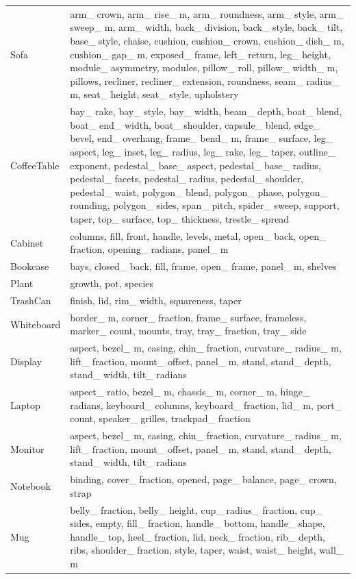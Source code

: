 \begin{longtable}{p{.20\linewidth}p{.74\linewidth}}
Sofa & arm\_ crown, arm\_ rise\_ m, arm\_ roundness, arm\_ style, arm\_ sweep\_ m, arm\_ width, back\_ division, back\_ style, back\_ tilt, base\_ style, chaise, cushion, cushion\_ crown, cushion\_ dish\_ m, cushion\_ gap\_ m, exposed\_ frame, left\_ return, leg\_ height, module\_ asymmetry, modules, pillow\_ roll, pillow\_ width\_ m, pillows, recliner, recliner\_ extension, roundness, seam\_ radius\_ m, seat\_ height, seat\_ style, upholstery \\
CoffeeTable & bay\_ rake, bay\_ style, bay\_ width, beam\_ depth, boat\_ blend, boat\_ end\_ width, boat\_ shoulder, capsule\_ blend, edge\_ bevel, end\_ overhang, frame\_ bend\_ m, frame\_ surface, leg\_ aspect, leg\_ inset, leg\_ radius, leg\_ rake, leg\_ taper, outline\_ exponent, pedestal\_ base\_ aspect, pedestal\_ base\_ radius, pedestal\_ facets, pedestal\_ radius, pedestal\_ shoulder, pedestal\_ waist, polygon\_ blend, polygon\_ phase, polygon\_ rounding, polygon\_ sides, span\_ pitch, spider\_ sweep, support, taper, top\_ surface, top\_ thickness, trestle\_ spread \\
Cabinet & columns, fill, front, handle, levels, metal, open\_ back, open\_ fraction, opening\_ radians, panel\_ m \\
Bookcase & bays, closed\_ back, fill, frame, open\_ frame, panel\_ m, shelves \\
Plant & growth, pot, species \\
TrashCan & finish, lid, rim\_ width, squareness, taper \\
Whiteboard & border\_ m, corner\_ fraction, frame\_ surface, frameless, marker\_ count, mounts, tray, tray\_ fraction, tray\_ side \\
Display & aspect, bezel\_ m, casing, chin\_ fraction, curvature\_ radius\_ m, lift\_ fraction, mount\_ offset, panel\_ m, stand, stand\_ depth, stand\_ width, tilt\_ radians \\
Laptop & aspect\_ ratio, bezel\_ m, chassis\_ m, corner\_ m, hinge\_ radians, keyboard\_ columns, keyboard\_ fraction, lid\_ m, port\_ count, speaker\_ grilles, trackpad\_ fraction \\
Monitor & aspect, bezel\_ m, casing, chin\_ fraction, curvature\_ radius\_ m, lift\_ fraction, mount\_ offset, panel\_ m, stand, stand\_ depth, stand\_ width, tilt\_ radians \\
Notebook & binding, cover\_ fraction, opened, page\_ balance, page\_ crown, strap \\
Mug & belly\_ fraction, belly\_ height, cup\_ radius\_ fraction, cup\_ sides, empty, fill\_ fraction, handle\_ bottom, handle\_ shape, handle\_ top, heel\_ fraction, lid, neck\_ fraction, rib\_ depth, ribs, shoulder\_ fraction, style, taper, waist, waist\_ height, wall\_ m \\

\end{longtable}
